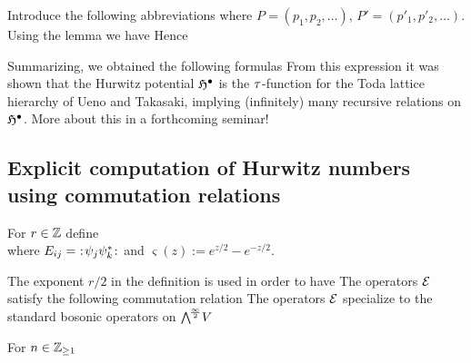 \documentclass[10pt,handout]{beamer} %
\begin{document}
\begin{frame}
Introduce the following abbreviations
where $P=(p_1,p_2,\ldots)$, $P'=(p'_1,p'_2,\ldots)$. \pause
Using the lemma we have
\pause
Hence

\end{frame}

\begin{frame}

Summarizing, we obtained the following formulas
\pause
From this expression it was shown that the Hurwitz potential $\mathfrak H^\bullet$ is the $\tau$-function for the Toda lattice hierarchy of Ueno and Takasaki, implying (infinitely) many recursive relations on $\mathfrak H^\bullet$. More about this in a forthcoming seminar!
\end{frame}

\subsection{Explicit computation of Hurwitz numbers using commutation relations}

\begin{frame}

\begin{definition}
	For $r\in\mathbb Z$ define\\[-15pt]
	where $E_{ij}=\ :\!{\psi_j\psi_k^*}\!:$ and $\varsigma(z):=e^{z/2}-e^{-z/2}$.
\end{definition}\pause

The exponent $r/2$ in the definition is used in order to have
The operators $\mathcal E$ satisfy the following commutation relation
The operators $\mathcal E$ specialize to the standard bosonic operators on $\bigwedge^{\!\frac\infty2}\!V$
\vspace*{-\baselineskip}\pause
\begin{lemma}
	For $n\in\mathbb Z_{\geq1}$
\end{lemma}

\end{frame}
\end{document}
